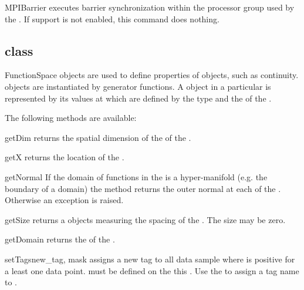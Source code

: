 \begin{methoddesc}[Domain]{MPIBarrier}{}
executes barrier synchronization within 
the \MPI processor group used by the \Domain.
If \MPI support is not enabled, this command does nothing. 
\end{methoddesc}

\subsection{\FunctionSpace class}
\begin{classdesc}{FunctionSpace}{}
\FunctionSpace objects are used to define properties of \Data objects, such as continuity. \FunctionSpace objects
are instantiated by generator functions. A \Data object in a particular \FunctionSpace is 
represented by its values at \DataSamplePoints which are defined by the type and the \Domain of the
\FunctionSpace.
\end{classdesc}
The following methods are available:
\begin{methoddesc}[FunctionSpace]{getDim}{}
returns the spatial dimension of the \Domain of the \FunctionSpace.
\end{methoddesc}



\begin{methoddesc}[FunctionSpace]{getX}{}
returns the location of the \DataSamplePoints.
\end{methoddesc}

\begin{methoddesc}[FunctionSpace]{getNormal}{}
If the domain of functions in the \FunctionSpace 
is a hyper-manifold (e.g. the boundary of a domain)
the method returns the outer normal at each of the 
\DataSamplePoints. Otherwise an exception is raised.
\end{methoddesc}

\begin{methoddesc}[FunctionSpace]{getSize}{}
returns a \Data objects measuring the spacing of the \DataSamplePoints.  
The size may be zero.
\end{methoddesc}

\begin{methoddesc}[FunctionSpace]{getDomain}{}
returns the \Domain of the \FunctionSpace.
\end{methoddesc}

\begin{methoddesc}[FunctionSpace]{setTags}{new_tag, mask}
assigns a new tag  to all data sample 
where  is positive for a least one data point. 
 must be defined on the this \FunctionSpace.
Use the  to assign a tag name to .
\end{methoddesc}

